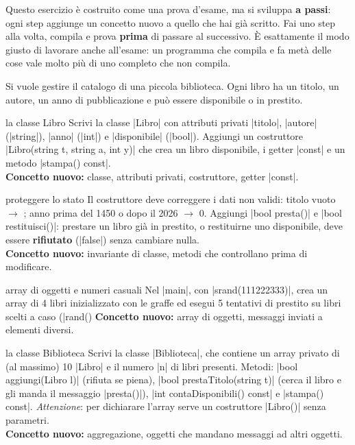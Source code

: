 Questo esercizio è costruito come una prova d'esame, ma si sviluppa \textbf{a
passi}: ogni step aggiunge un concetto nuovo a quello che hai già scritto.
Fai uno step alla volta, compila e prova \textbf{prima} di passare al
successivo. È esattamente il modo giusto di lavorare anche all'esame: un
programma che compila e fa metà delle cose vale molto più di uno completo che
non compila.

\begin{traccia}
Si vuole gestire il catalogo di una piccola biblioteca. Ogni libro ha un titolo,
un autore, un anno di pubblicazione e può essere disponibile o in prestito.
\end{traccia}

\begin{step}{la classe Libro}
Scrivi la classe \cc|Libro| con attributi privati \cc|titolo|, \cc|autore|
(\cc|string|), \cc|anno| (\cc|int|) e \cc|disponibile| (\cc|bool|). Aggiungi un
costruttore \cc|Libro(string t, string a, int y)| che crea un libro disponibile,
i getter \cc|const| e un metodo \cc|stampa() const|.\\[0.3em]
\textbf{Concetto nuovo:} classe, attributi privati, costruttore, getter \cc|const|.
\end{step}

\begin{step}{proteggere lo stato}
Il costruttore deve correggere i dati non validi: titolo vuoto $\to$
; anno prima del 1450 o dopo il 2026 $\to$ 0.
Aggiungi \cc|bool presta()| e \cc|bool restituisci()|: prestare un libro già in
prestito, o restituirne uno disponibile, deve essere \textbf{rifiutato}
(\cc|false|) senza cambiare nulla.\\[0.3em]
\textbf{Concetto nuovo:} invariante di classe, metodi che controllano prima di modificare.
\end{step}

\begin{step}{array di oggetti e numeri casuali}
Nel \cc|main|, con \cc|srand(111222333)|, crea un array di 4 libri inizializzato
con le graffe ed esegui 5 tentativi di prestito su libri scelti a caso
(\cc|rand() %
\textbf{Concetto nuovo:} array di oggetti, messaggi inviati a elementi diversi.
\end{step}

\begin{step}{la classe Biblioteca}
Scrivi la classe \cc|Biblioteca|, che contiene un array privato di (al massimo)
10 \cc|Libro| e il numero \cc|n| di libri presenti. Metodi:
\cc|bool aggiungi(Libro l)| (rifiuta se piena), \cc|bool prestaTitolo(string t)|
(cerca il libro e gli manda il messaggio \cc|presta()|), \cc|int contaDisponibili() const|
e \cc|stampa() const|. \emph{Attenzione}: per dichiarare l'array serve un
costruttore \cc|Libro()| senza parametri.\\[0.3em]
\textbf{Concetto nuovo:} aggregazione, oggetti che mandano messaggi ad altri oggetti.
\end{step}

